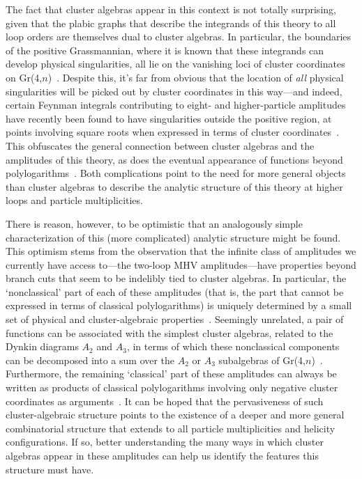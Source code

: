 \documentclass[12pt]{article}
\begin{document}
The fact that cluster algebras appear in this context is not totally surprising, given that the plabic graphs that describe the integrands of this theory to all loop orders are themselves dual to cluster algebras. In particular, the boundaries of the positive Grassmannian, where it is known that these integrands can develop physical singularities, all lie on the vanishing loci of cluster coordinates on Gr(4,$n$)~\cite{ArkaniHamed:2012nw}. Despite this, it's far from obvious that the location of \emph{all} physical singularities will be picked out by cluster coordinates in this way---and indeed, certain Feynman integrals contributing to eight- and higher-particle amplitudes have recently been found to have singularities outside the positive region, at points involving square roots when expressed in terms of cluster coordinates~\cite{Prlina:2017azl,Bourjaily:2018aeq,Henn:2018cdp}. This obfuscates the general connection between cluster algebras and the amplitudes of this theory, as does the eventual appearance of functions beyond polylogarithms~\cite{CaronHuot:2012ab,Bourjaily:2015jna,Bourjaily:2017wjl,Bourjaily:2017bsb,Bourjaily:2018ycu,Bourjaily:2018yfy}. Both complications point to the need for more general objects than cluster algebras to describe the analytic structure of this theory at higher loops and particle multiplicities.

There is reason, however, to be optimistic that an analogously simple characterization of this (more complicated) analytic structure might be found. This optimism stems from the observation that the infinite class of amplitudes we currently have access to---the two-loop MHV amplitudes---have properties beyond branch cuts that seem to be indelibly tied to cluster algebras. In particular, the `nonclassical' part of each of these amplitudes (that is, the part that cannot be expressed in terms of classical polylogarithms) is uniquely determined by a small set of physical and cluster-algebraic properties~\cite{Golden:2014pua}.  Seemingly unrelated, a pair of functions can be associated with the simplest cluster algebras, related to the Dynkin diagrams $A_2$ and $A_3$, in terms of which these nonclassical components can be decomposed into a sum over the $A_2$ or $A_3$ subalgebras of Gr(4,$n$)~\cite{Golden:2014xqa}. Furthermore, the remaining `classical' part of these amplitudes can always be written as products of classical polylogarithms involving only negative cluster coordinates as arguments~\cite{Golden:2014xqf}. It can be hoped that the pervasiveness of such cluster-algebraic structure points to the existence of a deeper and more general combinatorial structure that extends to all particle multiplicities and helicity configurations. If so, better understanding the many ways in which cluster algebras appear in these amplitudes can help us identify the features this structure must have.
\end{document}
